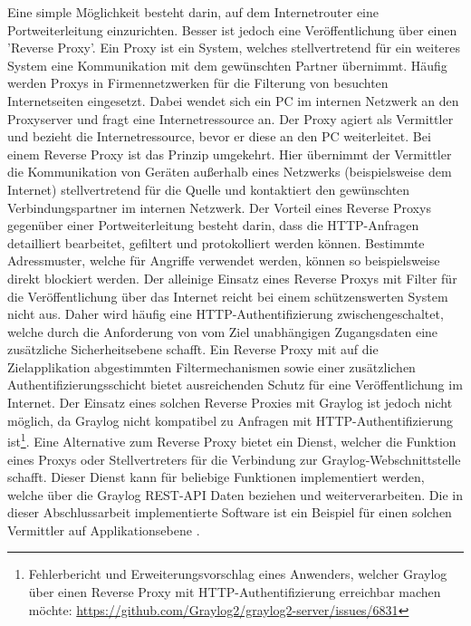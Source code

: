 Eine simple Möglichkeit besteht darin, auf dem Internetrouter eine Portweiterleitung einzurichten. Besser ist jedoch eine Veröffentlichung über einen 'Reverse Proxy'. Ein Proxy ist ein System, welches stellvertretend für ein weiteres System eine Kommunikation mit dem gewünschten Partner übernimmt. Häufig werden Proxys in Firmennetzwerken für die Filterung von besuchten Internetseiten eingesetzt. Dabei wendet sich ein PC im internen Netzwerk an den Proxyserver und fragt eine Internetressource an. Der Proxy agiert als Vermittler und bezieht die Internetressource, bevor er diese an den PC weiterleitet. Bei einem Reverse Proxy ist das Prinzip umgekehrt. Hier übernimmt der Vermittler die Kommunikation von Geräten außerhalb eines Netzwerks (beispielsweise dem Internet) stellvertretend für die Quelle und kontaktiert den gewünschten Verbindungspartner im internen Netzwerk. Der Vorteil eines Reverse Proxys gegenüber einer Portweiterleitung besteht darin, dass die HTTP-Anfragen detailliert bearbeitet, gefiltert und protokolliert werden können. Bestimmte Adressmuster, welche für Angriffe verwendet werden, können so beispielsweise direkt blockiert werden. Der alleinige Einsatz eines Reverse Proxys mit Filter für die Veröffentlichung über das Internet reicht bei einem schützenswerten System nicht aus. Daher wird häufig eine HTTP-Authentifizierung zwischengeschaltet, welche durch die Anforderung von vom Ziel unabhängigen Zugangsdaten eine zusätzliche Sicherheitsebene schafft. Ein Reverse Proxy mit auf die Zielapplikation abgestimmten Filtermechanismen sowie einer zusätzlichen Authentifizierungsschicht bietet ausreichenden Schutz für eine Veröffentlichung im Internet. Der Einsatz eines solchen Reverse Proxies mit Graylog ist jedoch nicht möglich, da Graylog nicht kompatibel zu Anfragen mit HTTP-Authentifizierung ist\footnote{Fehlerbericht und Erweiterungsvorschlag eines Anwenders, welcher Graylog über einen Reverse Proxy mit HTTP-Authentifizierung erreichbar machen möchte: \url{https://github.com/Graylog2/graylog2-server/issues/6831}}. Eine Alternative zum Reverse Proxy bietet ein Dienst, welcher die Funktion eines Proxys oder Stellvertreters für die Verbindung zur Graylog-Webschnittstelle schafft. Dieser Dienst kann für beliebige Funktionen implementiert werden, welche über die Graylog REST-API Daten beziehen und weiterverarbeiten. Die in dieser Abschlussarbeit implementierte Software ist ein Beispiel für einen solchen Vermittler auf Applikationsebene \cite[S. 12 ff.]{bsi-websec}.
